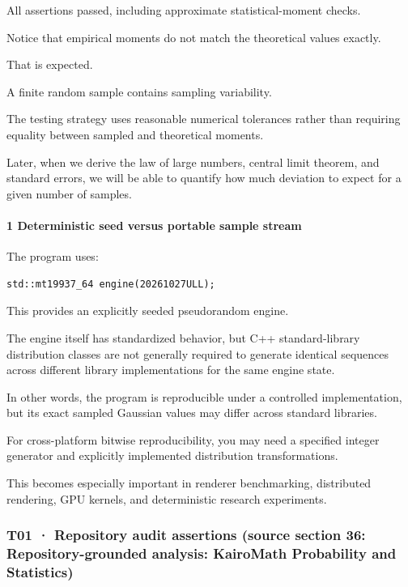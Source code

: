 All assertions passed, including approximate statistical-moment checks.

Notice that empirical moments do not match the theoretical values exactly.

That is expected.

A finite random sample contains sampling variability.

The testing strategy uses reasonable numerical tolerances rather than requiring equality between sampled and theoretical moments.

Later, when we derive the law of large numbers, central limit theorem, and standard errors, we will be able to quantify how much deviation to expect for a given number of samples.

\paragraph{1 Deterministic seed versus portable sample stream}\label{02-foundations-ii-ch039-deterministic-seed-versus-portable-sample-stream}

The program uses:

\begin{verbatim}
std::mt19937_64 engine(20261027ULL);
\end{verbatim}

This provides an explicitly seeded pseudorandom engine.

The engine itself has standardized behavior, but C++ standard-library distribution classes are not generally required to generate identical sequences across different library implementations for the same engine state.

In other words, the program is reproducible under a controlled implementation, but its exact sampled Gaussian values may differ across standard libraries.

For cross-platform bitwise reproducibility, you may need a specified integer generator and explicitly implemented distribution transformations.

This becomes especially important in renderer benchmarking, distributed rendering, GPU kernels, and deterministic research experiments.

\subsubsection{T01 · Repository audit assertions (source section 36: Repository-grounded analysis: KairoMath Probability and Statistics)}\label{02-foundations-ii-ch039-t01-repository-audit-assertions-source-section-36-repository-grounded-analysis-kairomath-probability-and-statistics}

